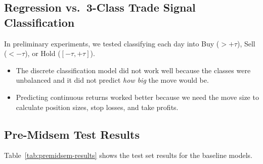 \subsection{Regression vs.\ 3-Class Trade Signal Classification}
In preliminary experiments, we tested classifying each day into Buy ($>+\tau$), Sell ($<-\tau$), or Hold ($[-\tau, +\tau]$). 
\begin{itemize}[leftmargin=1.5cm, itemsep=1pt]
	\item The discrete classification model did not work well because the classes were unbalanced and it did not predict \textit{how big} the move would be.
	\item Predicting continuous returns worked better because we need the move size to calculate position sizes, stop losses, and take profits.
\end{itemize}

\subsection{Pre-Midsem Test Results}
Table~\ref{tab:premidsem-results} shows the test set results for the baseline models.

